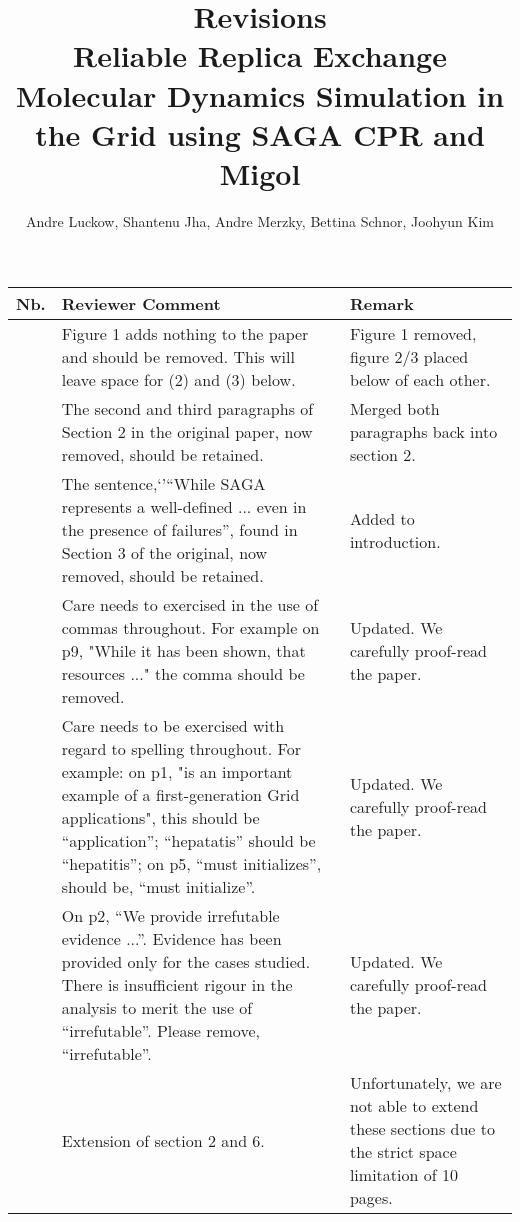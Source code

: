 \documentclass[]{article}
\title{\textbf{Revisions}\\Reliable Replica Exchange Molecular Dynamics Simulation in the Grid using SAGA CPR 
and Migol}
\author{Andre Luckow, Shantenu Jha, Andre Merzky, Bettina Schnor, Joohyun Kim}
\newcounter{mycounter}
\newcommand{\COUNTER}{\addtocounter{mycounter}{1} \arabic{mycounter}}
\begin{document}
\maketitle


\begin{longtable}{|p{}|p{}|p{}|}
\hline 

\textbf{Nb.} &\textbf{Reviewer Comment} &\textbf{Remark} \\
\hline
\endhead
\COUNTER
&Figure 1 adds nothing to the paper and should be removed. This will leave space for (2) and (3) 
below. 
&Figure 1 removed, figure 2/3 placed below of each other.
\\
\hline
\COUNTER
&The second and third paragraphs of Section 2 in the original paper, now removed, should be 
retained. 
& Merged both paragraphs back into section 2.
\\
\hline
\COUNTER
&The sentence,`'``While SAGA represents a well-defined ... even in the presence of failures'', found 
in Section 3 of the original, now removed, should be retained. 
& Added to introduction.
\\
\hline
\COUNTER&
Care needs to exercised in the use of commas throughout. For example on p9, "While it has 
been shown, that resources ..." the comma should be removed. 
&Updated. We carefully proof-read the paper. 
\\
\hline
\COUNTER
& Care needs to be exercised with regard to spelling throughout. For example: on p1, "is an 
important example of a first-generation Grid applications", this should be ``application''; ``hepatatis'' 
should be ``hepatitis''; on p5, ``must initializes'', should be, ``must initialize''. 
& Updated. We carefully proof-read the paper.
\\
\hline
\COUNTER&
On p2, ``We provide irrefutable evidence ...''. Evidence has been provided only for the cases 
studied. There is insufficient rigour in the analysis to merit the use of ``irrefutable''. Please remove, 
``irrefutable''. 
& Updated. We carefully proof-read the paper.
\\
\hline
\COUNTER
&Extension of section 2 and 6. 
&Unfortunately, we are not able to extend these sections due to the strict space limitation of 10 pages.\\
\hline
\end{longtable} 
\end{document}
